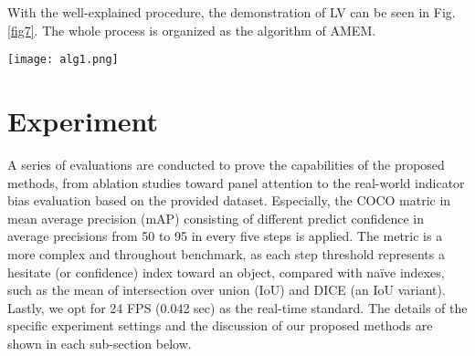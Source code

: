 \documentclass{article}
\begin{document}
\useshortskip


With the well-explained procedure, the demonstration of LV can be seen in Fig. \ref{fig7}. The whole process is organized as the algorithm of AMEM.

\begin{center}
    \texttt{[image: alg1.png]}
\end{center}

\section{Experiment}
\label{sec5}
A series of evaluations are conducted to prove the capabilities of the proposed methods, from ablation studies toward panel attention to the real-world indicator bias evaluation based on the provided dataset. Especially, the COCO matric in mean average precision (mAP) consisting of different predict confidence in average precisions from 50 to 95 in every five steps is applied. The metric is a more complex and throughout benchmark, as each step threshold represents a hesitate (or confidence) index toward an object, compared with naïve indexes, such as the mean of intersection over union (IoU) and DICE (an IoU variant). Lastly, we opt for 24 FPS (0.042 sec) as the real-time standard. The details of the specific experiment settings and the discussion of our proposed methods are shown in each sub-section below.
\end{document}
